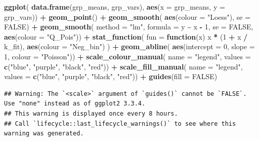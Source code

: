 \documentclass[
  12pt,
]{book}
\newenvironment{Shaded}{\begin{snugshade}}{\end{snugshade}}
\newcommand{\ControlFlowTok}[1]{\textcolor[rgb]{0.13,0.29,0.53}{\textbf{#1}}}
\newcommand{\DataTypeTok}[1]{\textcolor[rgb]{0.13,0.29,0.53}{#1}}
\newcommand{\DecValTok}[1]{\textcolor[rgb]{0.00,0.00,0.81}{#1}}
\newcommand{\KeywordTok}[1]{\textcolor[rgb]{0.13,0.29,0.53}{\textbf{#1}}}
\newcommand{\NormalTok}[1]{#1}
\newcommand{\OperatorTok}[1]{\textcolor[rgb]{0.81,0.36,0.00}{\textbf{#1}}}
\newcommand{\OtherTok}[1]{\textcolor[rgb]{0.56,0.35,0.01}{#1}}
\newcommand{\StringTok}[1]{\textcolor[rgb]{0.31,0.60,0.02}{#1}}
\begin{document}
\begin{Shaded}
\begin{Highlighting}[]
\KeywordTok{ggplot}\NormalTok{(}
  \KeywordTok{data.frame}\NormalTok{(grp\_means, grp\_vars),}
  \KeywordTok{aes}\NormalTok{(}\DataTypeTok{x =}\NormalTok{ grp\_means, }\DataTypeTok{y =}\NormalTok{ grp\_vars)) }\OperatorTok{+}
\StringTok{  }\KeywordTok{geom\_point}\NormalTok{() }\OperatorTok{+}
\StringTok{  }\KeywordTok{geom\_smooth}\NormalTok{(}
    \KeywordTok{aes}\NormalTok{(}\DataTypeTok{colour =} \StringTok{"Loess"}\NormalTok{), }\DataTypeTok{se =} \OtherTok{FALSE}\NormalTok{) }\OperatorTok{+}
\StringTok{  }\KeywordTok{geom\_smooth}\NormalTok{(}
    \DataTypeTok{method =} \StringTok{"lm"}\NormalTok{, }\DataTypeTok{formula =}\NormalTok{ y }\OperatorTok{\textasciitilde{}}\StringTok{ }\NormalTok{x }\OperatorTok{{-}}\StringTok{ }\DecValTok{1}\NormalTok{, }\DataTypeTok{se =} \OtherTok{FALSE}\NormalTok{,}
    \KeywordTok{aes}\NormalTok{(}\DataTypeTok{colour =} \StringTok{"Q\_Pois"}\NormalTok{)) }\OperatorTok{+}
\StringTok{  }\KeywordTok{stat\_function}\NormalTok{(}
    \DataTypeTok{fun =} \ControlFlowTok{function}\NormalTok{(x) x }\OperatorTok{*}\StringTok{ }\NormalTok{(}\DecValTok{1} \OperatorTok{+}\StringTok{ }\NormalTok{x }\OperatorTok{/}\StringTok{ }\NormalTok{k\_fit),}
    \KeywordTok{aes}\NormalTok{(}\DataTypeTok{colour =} \StringTok{"Neg\_bin"}\NormalTok{)}
\NormalTok{  ) }\OperatorTok{+}
\StringTok{  }\KeywordTok{geom\_abline}\NormalTok{(}
    \KeywordTok{aes}\NormalTok{(}\DataTypeTok{intercept =} \DecValTok{0}\NormalTok{, }\DataTypeTok{slope =} \DecValTok{1}\NormalTok{, }\DataTypeTok{colour =} \StringTok{"Poisson"}\NormalTok{)) }\OperatorTok{+}
\StringTok{  }\KeywordTok{scale\_colour\_manual}\NormalTok{(}
    \DataTypeTok{name =} \StringTok{"legend"}\NormalTok{,}
    \DataTypeTok{values =} \KeywordTok{c}\NormalTok{(}\StringTok{"blue"}\NormalTok{, }\StringTok{"purple"}\NormalTok{, }\StringTok{"black"}\NormalTok{, }\StringTok{"red"}\NormalTok{)) }\OperatorTok{+}
\StringTok{  }\KeywordTok{scale\_fill\_manual}\NormalTok{(}
    \DataTypeTok{name =} \StringTok{"legend"}\NormalTok{,}
    \DataTypeTok{values =} \KeywordTok{c}\NormalTok{(}\StringTok{"blue"}\NormalTok{, }\StringTok{"purple"}\NormalTok{, }\StringTok{"black"}\NormalTok{, }\StringTok{"red"}\NormalTok{)) }\OperatorTok{+}
\StringTok{  }\KeywordTok{guides}\NormalTok{(}\DataTypeTok{fill =} \OtherTok{FALSE}\NormalTok{)}
\end{Highlighting}
\end{Shaded}

\begin{verbatim}
## Warning: The `<scale>` argument of `guides()` cannot be `FALSE`. Use "none" instead as of ggplot2 3.3.4.
## This warning is displayed once every 8 hours.
## Call `lifecycle::last_lifecycle_warnings()` to see where this warning was generated.
\end{verbatim}
\end{document}
